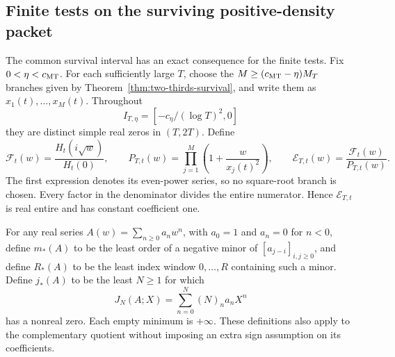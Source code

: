 \subsection{Finite tests on the surviving positive-density packet}
\label{sec:fd-density-detection}

The common survival interval has an exact consequence for the finite
tests. Fix \(0<\eta<c_{\rm MT}\). For each sufficiently large \(T\),
choose the \(M\ge(c_{\rm MT}-\eta)M_T\) branches given by
Theorem~\ref{thm:two-thirds-survival}, and write them as
\(x_1(t),\ldots,x_M(t)\). Throughout
\[
 I_{T,\eta}=[-c_\eta/(\log T)^2,0]
\]
they are distinct simple real zeros in \((T,2T)\). Define
\[
 \mathcal F_t(w)=\frac{H_t(i\sqrt w)}{H_t(0)},\qquad
 P_{T,t}(w)=\prod_{j=1}^{M}\left(1+\frac{w}{x_j(t)^2}\right),
 \qquad \mathcal E_{T,t}(w)=\frac{\mathcal F_t(w)}{P_{T,t}(w)}.
\]
The first expression denotes its even-power series, so no square-root
branch is chosen. Every factor in the denominator divides the entire
numerator. Hence \(\mathcal E_{T,t}\) is real entire and has constant
coefficient one.

For any real series \(A(w)=\sum_{n\ge0}a_nw^n\), with \(a_0=1\)
and \(a_n=0\) for \(n<0\), define \(m_*(A)\) to be the least
order of a negative minor of \([a_{j-i}]_{i,j\ge0}\), and define
\(R_*(A)\) to be the least index window \(0,\ldots,R\) containing
such a minor. Define \(j_*(A)\) to be the least \(N\ge1\) for which
\[
 J_N(A;X)=\sum_{n=0}^{N}(N)_n a_nX^n
\]
has a nonreal zero. Each empty minimum is \(+\infty\). These
definitions also apply to the complementary quotient without imposing
an extra sign assumption on its coefficients.

